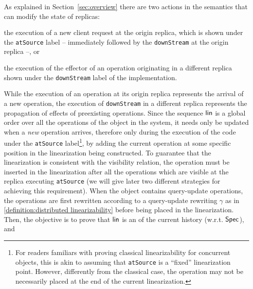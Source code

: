 As explained in Section~\ref{sec:overview} there are two actions in the
semantics that can modify the state of replicas:
\begin{inparaenum}
\item the execution of a new client request at the origin replica,
  which is shown under the \lstinline|atSource| label -- immediately
  followed by the \lstinline|downStream| at the origin replica
  --, or
\item the execution of the effector of an operation originating in a
  different replica shown under the \lstinline|downStream| label of
  the implementation.
\end{inparaenum}
%
While the execution of an operation at its origin replica represents
the arrival of a new operation, the execution of 
\lstinline|downStream| in a different replica represents the
propagation of effects of preexisting operations.
%
Since the sequence $\mathsf{lin}$ is a global order over all the
operations of the object in the system, it needs only be updated when
a \emph{new} operation arrives, therefore only during the execution of the code under the
\lstinline|atSource| label\footnote{For readers familiars with proving classical
  linearizability for concurrent objects, this is akin to assuming that
  \lstinline|atSource| is a ``fixed'' linearization point.
  However, differently from the classical case, the operation may not
  be necessarily placed at the end of the current linearization.},
by adding the current operation at some specific position in the
linearization being constructed.
%
%
To guarantee that the linearization is consistent with the visibility
relation, the operation must be inserted in the linearization after
all the operations which are visible at the replica executing
\lstinline|atSource| (we will give later two different strategies for achieving this requirement).
When the object contains query-update operations, the operations are
first rewritten according to a query-update rewriting $\gamma$ as in
\autoref{definition:distributed linearizability} before being placed
in the linearization.
Then, the objective is to prove that $\mathsf{lin}$ is an
\crdtlinearization{} of the current history (w.r.t. $\mathsf{Spec}{}$), and
